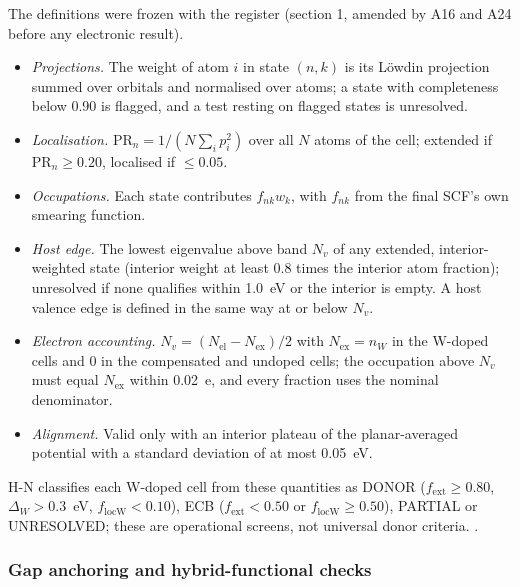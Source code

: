The definitions were frozen with the register (section 1, amended by A16 and A24 before any electronic result). %
\begin{itemize}
\item \emph{Projections.} The weight of atom $i$ in state $(n,k)$ is its L\"owdin projection \citep{Lowdin1950} summed
over orbitals and normalised over atoms; a state with completeness below 0.90 is flagged, and a test resting on flagged
states is unresolved. %
\item \emph{Localisation.} $\mathrm{PR}_n = 1/(N\sum_i p_i^2)$ over all $N$ atoms of the cell; extended if
$\mathrm{PR}_n \ge 0.20$, localised if $\le 0.05$. %
\item \emph{Occupations.} Each state contributes $f_{nk}w_k$, with $f_{nk}$ from the final SCF's own smearing
function. %
\item \emph{Host edge.} The lowest eigenvalue above band $N_v$ of any extended, interior-weighted state (interior
weight at least 0.8 times the interior atom fraction); unresolved if none qualifies within 1.0~eV or the interior is
empty. A host valence edge is defined in the same way at or below $N_v$. %
\item \emph{Electron accounting.} $N_v = (N_{\mathrm{el}} - N_{\mathrm{ex}})/2$ with $N_{\mathrm{ex}} = n_W$ in the
W-doped cells and 0 in the compensated and undoped cells; the occupation above $N_v$ must equal $N_{\mathrm{ex}}$
within 0.02~e, and every fraction uses the nominal denominator. %
\item \emph{Alignment.} Valid only with an interior plateau of the planar-averaged potential with a standard deviation
of at most 0.05~eV. %
\end{itemize}
H-N classifies each W-doped cell from these quantities as DONOR ($f_{\mathrm{ext}} \ge 0.80$, $\Delta_W > 0.3$~eV,
$f_{\mathrm{locW}} < 0.10$), ECB ($f_{\mathrm{ext}} < 0.50$ or $f_{\mathrm{locW}} \ge 0.50$), PARTIAL or UNRESOLVED;
these are  operational screens, not universal donor criteria. %
.

\subsubsection{Gap anchoring and hybrid-functional checks}
\label{sec:m-dft-gap}

